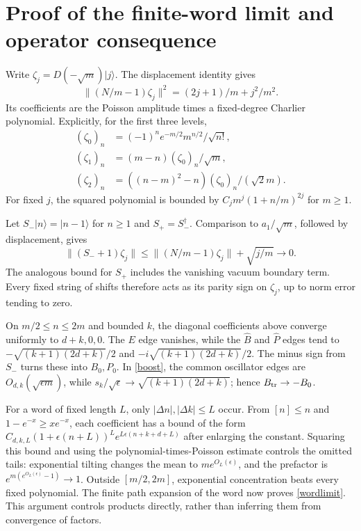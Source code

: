 \documentclass[11pt]{article}
\newcommand{\eps}{\epsilon}
\newcommand{\ket}[1]{|#1\rangle}
\newcommand{\B}{\widehat B}
\newcommand{\PP}{\widehat P}
\newcommand{\Bt}{B_{\rm tr}}
\begin{document}
\newpage
\section{Proof of the finite-word limit and operator consequence}
Write $\zeta_j=D(-\sqrt m)\ket j$.
The displacement identity gives
\[
 \|(N/m-1)\zeta_j\|^2=(2j+1)/m+j^2/m^2.
\]
Its coefficients are the Poisson amplitude times a fixed-degree
Charlier polynomial. Explicitly, for the first three levels,
\begin{align*}
 (\zeta_0)_n&=(-1)^n e^{-m/2}m^{n/2}/\sqrt{n!},\\
 (\zeta_1)_n&=(m-n)(\zeta_0)_n/\sqrt m,\\
 (\zeta_2)_n&=((n-m)^2-n)(\zeta_0)_n/(\sqrt2m).
\end{align*}
For fixed $j$, the squared polynomial is bounded by
$C_jm^j(1+n/m)^{2j}$ for $m\ge1$.

Let $S_-\ket n=\ket{n-1}$ for $n\ge1$ and $S_+=S_-^\dagger$.
Comparison to $a_1/\sqrt m$, followed by displacement, gives
\[
 \|(S_-+1)\zeta_j\|\le
 \|(N/m-1)\zeta_j\|+\sqrt{j/m}\longrightarrow0.
\]
The analogous bound for $S_+$ includes the vanishing vacuum
boundary term. Every fixed string of shifts therefore acts as
its parity sign on $\zeta_j$, up to norm error tending to zero.

On $m/2\le n\le2m$ and bounded $k$, the diagonal coefficients
above converge uniformly to $d+k,0,0$.
The $E$ edge vanishes, while the $\B$ and $\PP$ edges tend to
$-\sqrt{(k+1)(2d+k)}/2$ and
$-i\sqrt{(k+1)(2d+k)}/2$. The minus sign from $S_-$
turns these into $B_0,P_0$. In \eqref{boost}, the common
oscillator edges are $O_{d,k}(\sqrt{\eps m})$, while
$s_k/\sqrt\eps\to\sqrt{(k+1)(2d+k)}$; hence $\Bt\to-B_0$.

For a word of fixed length $L$, only $|\Delta n|,|\Delta k|\le L$
occur. From $[n]\le n$ and $1-e^{-x}\ge xe^{-x}$, each
coefficient has a bound of the form
$C_{d,k,L}(1+\eps(n+L))^L e^{L\eps(n+k+d+L)}$ after
enlarging the constant. Squaring this bound and using the
polynomial-times-Poisson estimate controls the omitted tails:
exponential tilting changes the mean to $me^{O_L(\eps)}$,
and the prefactor is $e^{m(e^{O_L(\eps)}-1)}\to1$.
Outside $[m/2,2m]$, exponential concentration beats every
fixed polynomial. The finite path expansion of the word now
proves \eqref{wordlimit}. This argument controls products
directly, rather than inferring them from convergence of factors.
\end{document}
